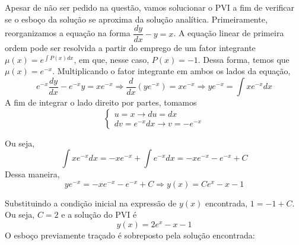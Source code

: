 \documentclass[oneside,12pt,a4paper]{report}
\begin{document}
\begin{resolucao}
        Apesar de não ser pedido na questão, vamos solucionar o PVI a fim de verificar se o esboço da solução se aproxima da solução analítica. Primeiramente, reorganizamos a equação na forma $\dfrac{dy}{dx}-y=x$. A equação linear de primeira ordem pode ser resolvida a partir do emprego de um fator integrante $\mu(x)=e^{\int P(x)dx}$, em que, nesse caso, $P(x)=-1$. Dessa forma, temos que $\mu(x)=e^{-x}$. Multiplicando o fator integrante em ambos os lados da equação,
        \[e^{-x}\frac{dy}{dx}-e^{-x}y=xe^{-x}\Rightarrow\frac{d}{dx}(ye^{-x})=xe^{-x}\Rightarrow ye^{-x}=\int xe^{-x}dx\]
        A fim de integrar o lado direito por partes, tomamos
        \[\begin{cases}
        u=x\rightarrow du=dx\\
        dv=e^{-x}dx\rightarrow v=-e^{-x}
        \end{cases}\]

        Ou seja,\[\int xe^{-x}dx=-xe^{-x}+\int e^{-x}dx=-xe^{-x}-e^{-x}+C\]
        Dessa maneira, \[ye^{-x}=-xe^{-x}-e^{-x}+C\Rightarrow y(x)=Ce^x-x-1\]

        Substituindo a condição inicial na expressão de $y(x)$ encontrada, $1=-1+C$. Ou seja, $C=2$ e a solução do PVI é \[\boxed{y(x)=2e^x-x-1}\] O esboço previamente traçado é sobreposto pela solução encontrada:

        \begin{figure}[H]
            \centering
\end{figure}
\end{resolucao}
\end{document}
